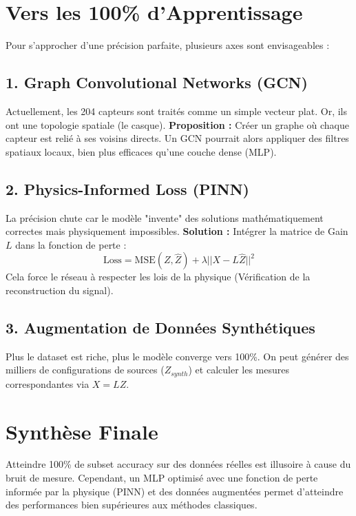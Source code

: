 \documentclass[a4paper,12pt,oneside]{report}
\begin{document}
\chapter{Vers les 100\% d'Apprentissage}

Pour s'approcher d'une précision parfaite, plusieurs axes sont envisageables :

\section{1. Graph Convolutional Networks (GCN)}
Actuellement, les 204 capteurs sont traités comme un simple vecteur plat. Or, ils ont une topologie spatiale (le casque).
\textbf{Proposition :} Créer un graphe où chaque capteur est relié à ses voisins directs. Un GCN pourrait alors appliquer des filtres spatiaux locaux, bien plus efficaces qu'une couche dense (MLP).

\section{2. Physics-Informed Loss (PINN)}
La précision chute car le modèle "invente" des solutions mathématiquement correctes mais physiquement impossibles.
\textbf{Solution :} Intégrer la matrice de Gain $L$ dans la fonction de perte :
$$ \text{Loss} = \text{MSE}(Z, \hat{Z}) + \lambda || X - L \hat{Z} ||^2 $$
Cela force le réseau à respecter les lois de la physique (Vérification de la reconstruction du signal).

\section{3. Augmentation de Données Synthétiques}
Plus le dataset est riche, plus le modèle converge vers 100\%. On peut générer des milliers de configurations de sources ($Z_{synth}$) et calculer les mesures correspondantes via $X = LZ$.

\chapter{Synthèse Finale}
Atteindre 100\% de subset accuracy sur des données réelles est illusoire à cause du bruit de mesure. Cependant, un MLP optimisé avec une fonction de perte informée par la physique (PINN) et des données augmentées permet d'atteindre des performances bien supérieures aux méthodes classiques.
\end{document}
